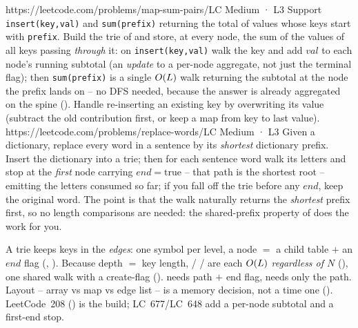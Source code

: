 \begin{practiceset}
    {https://leetcode.com/problems/map-sum-pairs/}{LC Medium · L3}
    {Support \texttt{insert(key,val)} and \texttt{sum(prefix)} returning the total of values whose keys
    start with \texttt{prefix}. Build the trie of  and store, at every node, the sum
    of the values of all keys passing \emph{through} it: on \texttt{insert(key,val)} walk the key and add
    $val$ to each node's running subtotal (an \emph{update} to a per-node aggregate, not just the terminal
    flag); then \texttt{sum(prefix)} is a single $O(L)$ walk returning the subtotal at the node the
    prefix lands on -- no DFS needed, because the answer is already aggregated on the spine
    (). Handle re-inserting an existing key by overwriting its value (subtract the
    old contribution first, or keep a map from key to last value).}
    {https://leetcode.com/problems/replace-words/}{LC Medium · L3}
    {Given a dictionary, replace every word in a sentence by its \emph{shortest} dictionary prefix. Insert
    the dictionary into a trie; then for each sentence word walk its letters and stop at the \emph{first}
    node carrying $\mathit{end}=\text{true}$ -- that path is the shortest root -- emitting the letters
    consumed so far; if you fall off the trie before any $\mathit{end}$, keep the original word. The
    point is that the walk naturally returns the \emph{shortest} prefix first, so no length comparisons
    are needed: the shared-prefix property of  does the work for you.}
\end{practiceset}

\begin{recallbox}
A trie keeps keys in the \emph{edges}: one symbol per level, a node $=$ a child table $+$ an
$\mathit{end}$ flag (, ). Because depth $=$ key length, 
/  /  are each $O(L)$ \emph{regardless of $N$} (),
one shared walk with a create-flag ().  needs path $+$ end flag,
 needs only the path. Layout -- array vs map vs edge list -- is a memory decision, not a
time one (). LeetCode~208 () is the build; LC~677/LC~648
add a per-node subtotal and a first-end stop.
\end{recallbox}

